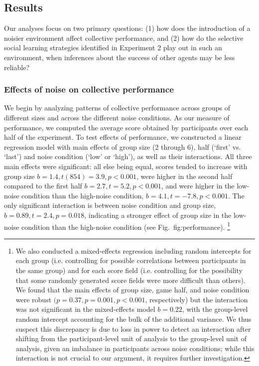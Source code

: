 \documentclass[12pt,letterpaper]{article}
\begin{document}
\subsection{Results}

Our analyses focus on two primary questions: (1) how does the introduction of a noisier environment affect collective performance, and (2) how do the selective social learning strategies identified in Experiment 2 play out in such an environment, when inferences about the success of other agents may be less reliable?

\subsubsection{Effects of noise on collective performance}

We begin by analyzing patterns of collective performance across groups of different sizes and across the different noise conditions.
As our measure of performance, we computed the average score obtained by participants over each half of the experiment.
To test effects of performance, we constructed a linear regression model with main effects of group size (2 through 6), half (`first' vs. `last')  and noise condition (`low' or `high'), as well as their interactions.
All three main effects were significant: all else being equal, scores tended to increase with group size $b=1.4, t(854)=3.9, p <0.001$, were higher in the second half compared to the first half $b=2.7,t=5.2,p<0.001$, and were higher in the low-noise condition than the high-noise condition, $b=4.1,t=-7.8,p<0.001$.
The only significant interaction is between noise condition and group size, $b=0.89,t=2.4, p=0.018$, indicating a stronger effect of group size in the low-noise condition than the high-noise condition (see Fig.~{fig:performance}).
\footnote{We also conducted a mixed-effects regression including random intercepts for each group (i.e. controlling for possible correlations between participants in the same group) and for each score field (i.e. controlling for the possibility that some randomly generated score fields were more difficult than others). We found that the main effects of group size, game half, and noise condition were robust $(p=0.37,p=0.001,p<0.001$, respectively) but the interaction was not significant in the mixed-effects model $b=0.22$, with the group-level random intercept accounting for the bulk of the additional variance. We thus suspect this discrepancy is due to loss in power to detect an interaction after shifting from the participant-level unit of analysis to the group-level unit of analysis, given an imbalance in participants across noise conditions; while this interaction is not crucial to our argument, it requires further investigation.}
\end{document}
